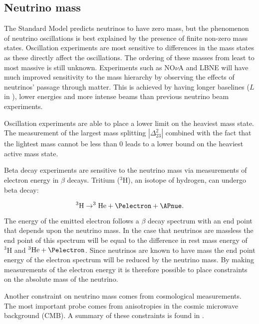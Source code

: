 \subsection{Neutrino mass}
\label{section:particle-physics:neutrino:mass}

The Standard Model predicts neutrinos to have zero mass, but the phenomenon of neutrino oscillations is best explained by the presence of finite non-zero mass states. Oscillation experiments are most sensitive to differences in the mass states as these directly affect the oscillations. The ordering of these masses from least to most massive is still unknown. Experiments such as NO$\nu$A \cite{Ayres:2004js} and LBNE \cite{Adams:2013qkq} will have much improved sensitivity to the mass hierarchy by observing the effects of neutrinos' passage through matter. This is achieved by having longer baselines ($L$ in ), lower energies and more intense beams than previous neutrino beam experiments.

Oscillation experiments are able to place a lower limit on the heaviest mass state. The measurement of the largest mass splitting $|\Delta_{23}^{2}|$ combined with the fact that the lightest mass cannot be less than 0 leads to a lower bound on the heaviest active mass state.


Beta decay experiments are sensitive to the neutrino mass via measurements of electron energy in $\beta$ decays. Tritium ($^3\mbox{H}$), an isotope of hydrogen, can undergo beta decay:

\begin{equation}
  ^{3}\mbox{H} \rightarrow ^{3}\mbox{He} + \Pelectron + \APnue.
  \label{eq:particle-physics:neutrino-mass:tritium-decay}
\end{equation}

\noindent The energy of the emitted electron follows a $\beta$ decay spectrum with an end point that depends upon the neutrino mass. In the case that neutrinos are massless the end point of this spectrum will be equal to the difference in rest mass energy of $^{3}\mbox{H}$ and $^{3}\mbox{He} + \Pelectron$. Since neutrinos are known to have mass the end point energy of the electron spectrum will be reduced by the neutrino mass. By making measurements of the electron energy it is therefore possible to place constraints on the absolute mass of the neutrino.

Another constraint on neutrino mass comes from cosmological measurements. The most important probe comes from anisotropies in the cosmic microwave background (CMB). A summary of these constraints is found in .

